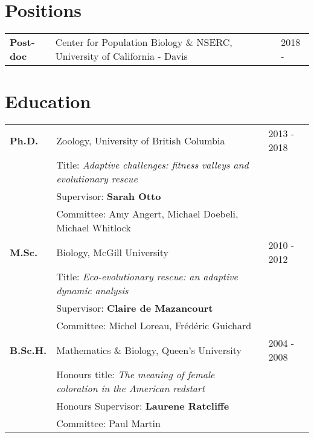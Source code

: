 \documentclass[12pt]{article}
\begin{document}

\section*{Positions}

\begin{tabular}{lll}
\textbf{Post-doc} & Center for Population Biology \& NSERC, University of California - Davis & 2018 -
\end{tabular}

\section*{Education}

\begin{tabular}{lll}
\textbf{Ph.D.} & Zoology, University of British Columbia & 2013 - 2018\\
& Title: \textit{Adaptive challenges: fitness valleys and evolutionary rescue}\\
& Supervisor: \textbf{Sarah Otto}\\
& Committee: Amy Angert, Michael Doebeli, Michael Whitlock\\
\textbf{M.Sc.} & Biology, McGill University & 2010 - 2012 \\
& Title: \textit{Eco-evolutionary rescue: an adaptive dynamic analysis}  \\
& Supervisor: \textbf{Claire de Mazancourt}\\
& Committee: Michel Loreau, Fr\'{e}d\'{e}ric Guichard\\
\textbf{B.Sc.H.} &  Mathematics \& Biology, Queen's University & 2004 - 2008\\ %
& Honours title: \textit{The meaning of female coloration in the American redstart}  \\
& Honours Supervisor: \textbf{Laurene Ratcliffe}\\
& Committee: Paul Martin\\
\end{tabular}
\end{document}
